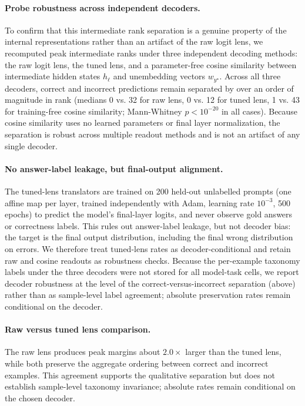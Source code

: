 \documentclass{article} %
\begin{document}
\paragraph{Probe robustness across independent decoders.}
To confirm that this intermediate rank separation is a genuine property of the internal representations rather than an artifact of the raw logit lens, we recomputed peak intermediate ranks under three independent decoding methods: the raw logit lens, the tuned lens, and a parameter-free cosine similarity between intermediate hidden states $h_\ell$ and unembedding vectors $w_{y^\star}$. Across all three decoders, correct and incorrect predictions remain separated by over an order of magnitude in rank (medians 0 vs. 32 for raw lens, 0 vs. 12 for tuned lens, 1 vs. 43 for training-free cosine similarity; Mann-Whitney $p < 10^{-20}$ in all cases). Because cosine similarity uses no learned parameters or final layer normalization, the separation is robust across multiple readout methods and is not an artifact of any single decoder.

\paragraph{No answer-label leakage, but final-output alignment.}
The tuned-lens translators are trained on 200 held-out unlabelled prompts (one affine map per layer, trained independently with Adam, learning rate $10^{-3}$, 500 epochs) to predict the model's final-layer logits, and never observe gold answers or correctness labels. This rules out answer-label leakage, but not decoder bias: the target is the final output distribution, including the final wrong distribution on errors. We therefore treat tuned-lens rates as decoder-conditional and retain raw and cosine readouts as robustness checks. Because the per-example taxonomy labels under the three decoders were not stored for all model-task cells, we report decoder robustness at the level of the correct-versus-incorrect separation (above) rather than as sample-level label agreement; absolute preservation rates remain conditional on the decoder.

\paragraph{Raw versus tuned lens comparison.}
The raw lens produces peak margins about $2.0\times$ larger than the tuned lens, while both preserve the aggregate ordering between correct and incorrect examples. This agreement supports the qualitative separation but does not establish sample-level taxonomy invariance; absolute rates remain conditional on the chosen decoder.
\end{document}
